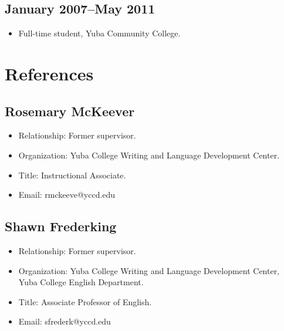 \documentclass[12pt]{article}
\begin{document}
\subsection*{January 2007–May 2011}
\label{sec-5-4}

\begin{itemize}
\item Full-time student, Yuba Community College.
\end{itemize}
\section*{References}
\label{sec-6}
\subsection*{Rosemary McKeever}
\label{sec-6-1}

\begin{itemize}
\item Relationship: Former supervisor.
\item Organization: Yuba College Writing and Language Development Center.
\item Title: Instructional Associate.
\item Email: rmckeeve@yccd.edu
\end{itemize}
\subsection*{Shawn Frederking}
\label{sec-6-2}

\begin{itemize}
\item Relationship: Former supervisor.
\item Organization: Yuba College Writing and Language Development Center,
    Yuba College English Department.
\item Title: Associate Professor of English.
\item Email: sfrederk@yccd.edu
\end{itemize}
\end{document}
